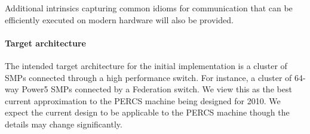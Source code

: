 Additional intrinsics capturing common idioms for communication that
can be efficiently executed on modern hardware will also be provided.

\paragraph{Target architecture}
The intended target architecture for the initial \Xtenlib{}
implementation is a cluster of SMPs connected through a high
performance switch. For instance, a cluster of 64-way Power5 SMPs
connected by a Federation switch. We view this as the best current
approximation to the PERCS machine being designed for 2010. We expect
the current design to be applicable to the PERCS machine though the
details may change significantly.
